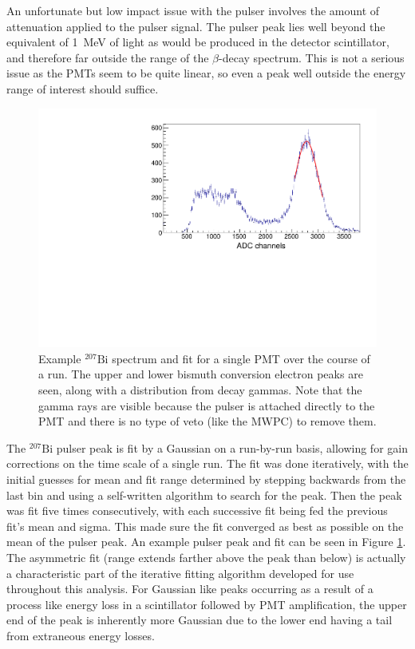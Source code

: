 An unfortunate but low impact issue with the pulser involves the amount of attenuation applied to the
pulser signal. The pulser peak lies well beyond the equivalent of 1~MeV of light as would be produced
in the detector scintillator, and therefore far outside the range of the $\beta$-decay spectrum. This
is not a serious issue as the PMTs seem to be quite linear, so even a peak well outside the
energy range of interest should suffice.

\begin{figure}[h] 
\centering
\includegraphics[scale=.60]{3-UCNAAnalysis/gain_bismuth2.pdf}
\caption{Example $^{207}\mathrm{Bi}$ spectrum and fit for a single PMT over
  the course of a run. The upper and lower bismuth conversion electron peaks are
  seen, along with a distribution from decay gammas. Note that the gamma rays are
  visible because the pulser is attached directly to the PMT and there is no type
  of veto (like the MWPC) to remove them.}
\label{fig:biPulser}
\end{figure}

The $^{207}\mathrm{Bi}$ pulser peak is fit by a Gaussian on a run-by-run basis, allowing for gain corrections on the time
scale of a single run. The fit was done iteratively, with the initial guesses for mean and fit range determined
by stepping backwards from the last bin and using a self-written algorithm to search for the peak. Then the peak
was fit five times consecutively, with each successive fit being fed the previous fit's mean and sigma. This
made sure the fit converged as best as possible on the mean of the pulser peak. An example pulser peak and fit
can be seen in Figure \ref{fig:biPulser}. The asymmetric fit (range extends farther above the peak than below)
is actually a characteristic part of the iterative
fitting algorithm developed for use throughout this analysis. For Gaussian like peaks occurring as a result of
a process like energy loss in a scintillator followed by PMT amplification, the upper end of the peak is
inherently more Gaussian due to the lower end having a tail from extraneous energy losses. 

